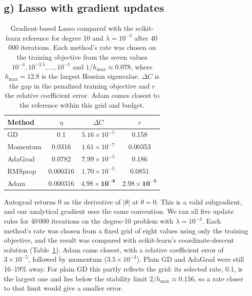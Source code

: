 \documentclass[aps,prb,reprint,superscriptaddress,nofootinbib,longbibliography,floatfix]{revtex4-2}
\begin{document}
\subsection{g) Lasso with gradient updates}\label{sec:res_lasso}
\begin{table}[tb]
\caption{Gradient-based Lasso compared with the scikit-learn reference for degree 10 and $\lambda=10^{-3}$ after 40\,000 iterations. Each method's rate was chosen on the training objective from the seven values $10^{-4},10^{-3.5},\dots,10^{-1}$ and $1/h_{\max}\approx0.078$, where $h_{\max}=12.8$ is the largest Hessian eigenvalue. $\Delta C$ is the gap in the penalized training objective and $r$ the relative coefficient error. Adam comes closest to the reference within this grid and budget.}\label{tab:lasso}
\begin{ruledtabular}
\begin{tabular}{lccc}
Method & $\eta$ & $\Delta C$ & $r$ \\ \hline
GD & 0.1 & $5.16\times10^{-5}$ & 0.158 \\
Momentum & 0.0316 & $1.61\times10^{-7}$ & 0.00353 \\
AdaGrad & 0.0782 & $7.99\times10^{-5}$ & 0.186 \\
RMSprop & 0.000316 & $1.70\times10^{-5}$ & 0.0851 \\
Adam & 0.000316 & $\mathbf{4.98\times10^{-8}}$ & $\mathbf{2.98\times10^{-5}}$ \\
\end{tabular}
\end{ruledtabular}
\end{table}

Autograd returns 0 as the derivative of $|\theta|$ at $\theta=0$. This is a valid subgradient, and our analytical gradient uses the same convention. We ran all five update rules for 40\,000 iterations on the degree-10 problem with $\lambda=10^{-3}$. Each method's rate was chosen from a fixed grid of eight values using only the training objective, and the result was compared with scikit-learn's coordinate-descent solution (Table~\ref{tab:lasso}). Adam came closest, with a relative coefficient error of $3\times10^{-5}$, followed by momentum ($3.5\times10^{-3}$). Plain GD and AdaGrad were still 16--19\% away. For plain GD this partly reflects the grid: its selected rate, 0.1, is the largest one and lies below the stability limit $2/h_{\max}\approx0.156$, so a rate closer to that limit would give a smaller error.
\end{document}
